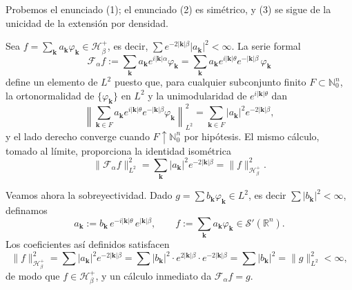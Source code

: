             \begin{Proof}
                Probemos el enunciado (1); el enunciado (2) es simétrico, y (3) se sigue de la unicidad de la extensión por densidad.

                Sea $f = \sum_{\boldsymbol{k}} a_{\boldsymbol{k}}\varphi_{\boldsymbol{k}} \in \mathcal{H}_\beta^+$, es decir, $\sum e^{-2|\boldsymbol{k}|\beta}|a_{\boldsymbol{k}}|^2 < \infty$. La serie formal
                \begin{equation*}
                    \mathcal{F}_\alpha f := \sum_{\boldsymbol{k}} a_{\boldsymbol{k}} e^{i|\boldsymbol{k}|\alpha}\varphi_{\boldsymbol{k}} = \sum_{\boldsymbol{k}} a_{\boldsymbol{k}} e^{i|\boldsymbol{k}|\theta}e^{-|\boldsymbol{k}|\beta}\,\varphi_{\boldsymbol{k}}
                \end{equation*}
                define un elemento de $L^2$ puesto que, para cualquier subconjunto finito $F\subset\mathbb{N}_0^n$, la ortonormalidad de $\{\varphi_{\boldsymbol{k}}\}$ en $L^2$ y la unimodularidad de $e^{i|\boldsymbol{k}|\theta}$ dan
                \begin{equation*}
                    \left\|\sum_{\boldsymbol{k}\in F} a_{\boldsymbol{k}} e^{i|\boldsymbol{k}|\theta}e^{-|\boldsymbol{k}|\beta}\varphi_{\boldsymbol{k}}\right\|_{L^2}^2 = \sum_{\boldsymbol{k}\in F} |a_{\boldsymbol{k}}|^2 e^{-2|\boldsymbol{k}|\beta},
                \end{equation*}
                y el lado derecho converge cuando $F\uparrow \mathbb{N}_0^n$ por hipótesis. El mismo cálculo, tomado al límite, proporciona la identidad isométrica
                \begin{equation}\label{eq:Cap2IsomComplejo}
                    \|\mathcal{F}_\alpha f\|_{L^2}^2 = \sum_{\boldsymbol{k}}|a_{\boldsymbol{k}}|^2 e^{-2|\boldsymbol{k}|\beta} = \|f\|_{\mathcal{H}_\beta^+}^2.
                \end{equation}

                Veamos ahora la sobreyectividad. Dado $g = \sum b_{\boldsymbol{k}}\varphi_{\boldsymbol{k}} \in L^2$, es decir $\sum |b_{\boldsymbol{k}}|^2 < \infty$, definamos
                \begin{equation*}
                    a_{\boldsymbol{k}} := b_{\boldsymbol{k}}\,e^{-i|\boldsymbol{k}|\theta}\,e^{|\boldsymbol{k}|\beta}, \qquad f := \sum_{\boldsymbol{k}} a_{\boldsymbol{k}}\varphi_{\boldsymbol{k}}\in \mathcal{S}'(\mathbb{R}^n).
                \end{equation*}
                Los coeficientes así definidos satisfacen
                \begin{equation*}
                    \|f\|_{\mathcal{H}_\beta^+}^2 = \sum |a_{\boldsymbol{k}}|^2 e^{-2|\boldsymbol{k}|\beta} = \sum |b_{\boldsymbol{k}}|^2\cdot e^{2|\boldsymbol{k}|\beta}\cdot e^{-2|\boldsymbol{k}|\beta} = \sum|b_{\boldsymbol{k}}|^2 = \|g\|_{L^2}^2 < \infty,
                \end{equation*}
                de modo que $f\in \mathcal{H}_\beta^+$, y un cálculo inmediato da $\mathcal{F}_\alpha f = g$.


\end{Proof}
